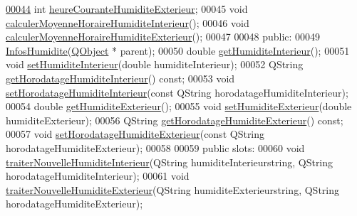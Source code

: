 \begin{DoxyCode}
\hyperlink{class_infos_humidite_ad7b450373a47ec831872872e0e5674ad}{00044}         \textcolor{keywordtype}{int} \hyperlink{class_infos_humidite_ad7b450373a47ec831872872e0e5674ad}{heureCouranteHumiditeExterieur};
00045         \textcolor{keywordtype}{void} \hyperlink{class_infos_humidite_acd903311f6c949f8f010b330f517e4f3}{calculerMoyenneHoraireHumiditeInterieur}();
00046         \textcolor{keywordtype}{void} \hyperlink{class_infos_humidite_afc4f6ba3cd4664118ef40f4c12b76506}{calculerMoyenneHoraireHumiditeExterieur}();
00047 
00048     \textcolor{keyword}{public}:
00049         \hyperlink{class_infos_humidite_a3c87ffa0e896fd5af90b1d9f15a47a57}{InfosHumidite}(\hyperlink{class_q_object}{QObject} * parent);
00050         \textcolor{keywordtype}{double} \hyperlink{class_infos_humidite_a652f7ca3e4b97352034fed62c6d865b7}{getHumiditeInterieur}();
00051         \textcolor{keywordtype}{void} \hyperlink{class_infos_humidite_a238c8b3bd6b09c4f770058a05468baa8}{setHumiditeInterieur}(\textcolor{keywordtype}{double} humiditeInterieur);
00052         QString \hyperlink{class_infos_humidite_a841d2583f206a9097fa3871adc8be568}{getHorodatageHumiditeInterieur}() \textcolor{keyword}{const};
00053         \textcolor{keywordtype}{void} \hyperlink{class_infos_humidite_a8054d13ab8f57504392756351c376534}{setHorodatageHumiditeInterieur}(\textcolor{keyword}{const} QString 
      horodatageHumiditeInterieur);
00054         \textcolor{keywordtype}{double} \hyperlink{class_infos_humidite_a23e537fdfa33336a3970838f445387ce}{getHumiditeExterieur}();
00055         \textcolor{keywordtype}{void} \hyperlink{class_infos_humidite_a8228ff1f1d0466df228ed3f2e2d269ac}{setHumiditeExterieur}(\textcolor{keywordtype}{double} humiditeExterieur);
00056         QString \hyperlink{class_infos_humidite_a04abb2841492704e125874464052bb4f}{getHorodatageHumiditeExterieur}() \textcolor{keyword}{const};
00057         \textcolor{keywordtype}{void} \hyperlink{class_infos_humidite_acc6231789bd923840dadf4f17310ce69}{setHorodatageHumiditeExterieur}(\textcolor{keyword}{const} QString 
      horodatageHumiditeExterieur);
00058 
00059     \textcolor{keyword}{public} slots:
00060         \textcolor{keywordtype}{void} \hyperlink{class_infos_humidite_a0995d68a036f73df3b5a86e5538104bd}{traiterNouvelleHumiditeInterieur}(QString 
      humiditeInterieurstring, QString horodatageHumiditeInterieur);
00061         \textcolor{keywordtype}{void} \hyperlink{class_infos_humidite_a8d17fa3c7d15b1ff8130ae5d22702e5f}{traiterNouvelleHumiditeExterieur}(QString 
      humiditeExterieurstring, QString horodatageHumiditeExterieur);

\end{DoxyCode}
